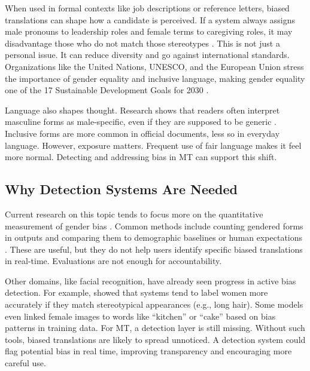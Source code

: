 When used in formal contexts like job descriptions or reference letters, biased translations can shape how a candidate is perceived. If a system always assigns male pronouns to leadership roles and female terms to caregiving roles, it may disadvantage those who do not match those stereotypes \parencite{bolukbasiManComputerProgrammer2016}. This is not just a personal issue. It can reduce diversity and go against international standards. Organizations like the United Nations, UNESCO, and the European Union stress the importance of gender equality and inclusive language, making gender equality one of the 17 Sustainable Development Goals for 2030 \parencite{sczesnyCanGenderFairLanguage2016,unitednationsAchieveGenderEquality2023}. 

Language also shapes thought. Research shows that readers often interpret masculine forms as male-specific, even if they are supposed to be generic \parencite{sczesnyCanGenderFairLanguage2016}. Inclusive forms are more common in official documents, less so in everyday language. However, exposure matters. Frequent use of fair language makes it feel more normal. Detecting and addressing bias in MT can support this shift.

\subsection{Why Detection Systems Are Needed}

Current research on this topic tends to focus more on the quantitative measurement of gender bias \parencite{rescignoGenderBiasMachine2023,barclayInvestigatingMarkersDrivers2024a,smacchiaDoesAIReflect2024}. Common methods include counting gendered forms in outputs and comparing them to demographic baselines or human expectations \parencite{rescignoGenderBiasMachine2023,pratesAssessingGenderBias2019,savoldiWhatHarmQuantifying2024}. These are useful, but they do not help users identify specific biased translations in real-time. Evaluations are not enough for accountability. 

Other domains, like facial recognition, have already seen progress in active bias detection. For example, \textcite{schwemmerDiagnosingGenderBias2020} showed that systems tend to label women more accurately if they match stereotypical appearances (e.g., long hair). Some models even linked female images to words like “kitchen” or “cake” based on bias patterns in training data. For MT, a detection layer is still missing. Without such tools, biased translations are likely to spread unnoticed. A detection system could flag potential bias in real time, improving transparency and encouraging more careful use.

